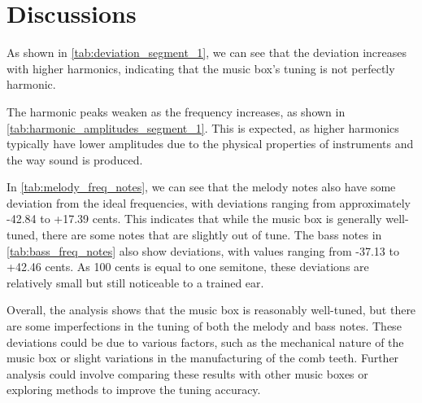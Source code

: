 \chapter{Discussions}


As shown in \autoref{tab:deviation_segment_1}, we can see that the deviation increases with higher harmonics, indicating that the music box's tuning is not perfectly harmonic.

The harmonic peaks weaken as the frequency increases, as shown in \autoref{tab:harmonic_amplitudes_segment_1}. This is expected, as higher harmonics typically have lower amplitudes due to the physical properties of instruments and the way sound is produced.

In \autoref{tab:melody_freq_notes}, we can see that the melody notes also have some deviation from the ideal frequencies, with deviations ranging from approximately -42.84 to +17.39 cents. This indicates that while the music box is generally well-tuned, there are some notes that are slightly out of tune. The bass notes in \autoref{tab:bass_freq_notes} also show deviations, with values ranging from -37.13 to +42.46 cents. As 100 cents is equal to one semitone, these deviations are relatively small but still noticeable to a trained ear.

Overall, the analysis shows that the music box is reasonably well-tuned, but there are some imperfections in the tuning of both the melody and bass notes. These deviations could be due to various factors, such as the mechanical nature of the music box or slight variations in the manufacturing of the comb teeth. Further analysis could involve comparing these results with other music boxes or exploring methods to improve the tuning accuracy.

